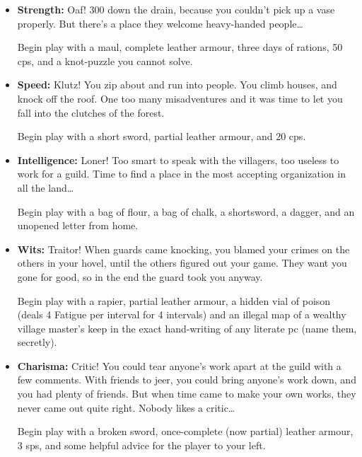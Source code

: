 \begin{multicols}{2}
\begin{itemize}

  \item
  \textbf{Strength:}
  Oaf!
  300  down the drain, because you couldn't pick up a vase properly.
  But there's a place they welcome heavy-handed people\ldots

  Begin play with a maul, complete leather armour, three days of rations, 50 \glspl{cp}, and a knot-puzzle you cannot solve.

  \item
  \textbf{Speed:}
  Klutz!
  You zip about and run into people.
  You climb houses, and knock off the roof.
  One too many misadventures and it was time to let you fall into the clutches of the forest.

  Begin play with a short sword, partial leather armour, and 20 \glspl{cp}.
  \item
  \textbf{Intelligence:}
  Loner!
  Too smart to speak with the villagers, too useless to work for a guild.
  Time to find a place in the most accepting organization in all the land\ldots

  Begin play with a bag of flour, a bag of chalk, a shortsword, a dagger, and an unopened letter from home.

  \item
  \textbf{Wits:}
  Traitor!
  When guards came knocking, you blamed your crimes on the others in your hovel, until the others figured out your game.
  They want you gone for good, so in the end the \gls{guard} took you anyway.

  Begin play with a rapier, partial leather armour, a hidden vial of poison (deals 4 Fatigue per interval for 4 intervals) and an illegal map of a wealthy village master's keep in the exact hand-writing of any literate \gls{pc} (name them, secretly).
  \item
  \textbf{Charisma:}
  Critic!
  You could tear anyone's work apart at the guild with a few comments.
  With friends to jeer, you could bring anyone's work down, and you had plenty of friends.
  But when time came to make your own works, they never came out quite right.
  Nobody likes a critic\ldots
  
  Begin play with a broken sword, once-complete (now partial) leather armour, 3 \glspl{sp}, and some helpful advice for the player to your left.

\end{itemize}

\end{multicols}
